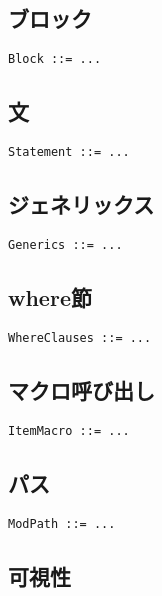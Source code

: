 \documentclass[dvipdfmx,uplatex,papersize,a4paper,10pt]{jsbook}
\theoremstyle{definition}
\begin{document}
\subsection{ブロック}

\begin{lstlisting}[language=BNFLike, gobble=2]
  Block ::= ...
\end{lstlisting}

\subsection{文}

\begin{lstlisting}[language=BNFLike, gobble=2]
  Statement ::= ...
\end{lstlisting}

\subsection{ジェネリックス}

\begin{lstlisting}[language=BNFLike, gobble=2]
  Generics ::= ...
\end{lstlisting}

\subsection{where節}

\begin{lstlisting}[language=BNFLike, gobble=2]
  WhereClauses ::= ...
\end{lstlisting}

\subsection{マクロ呼び出し}

\begin{lstlisting}[language=BNFLike, gobble=2]
  ItemMacro ::= ...
\end{lstlisting}

\subsection{パス}

\begin{lstlisting}[language=BNFLike, gobble=2]
  ModPath ::= ...
\end{lstlisting}

\subsection{可視性}
\end{document}
